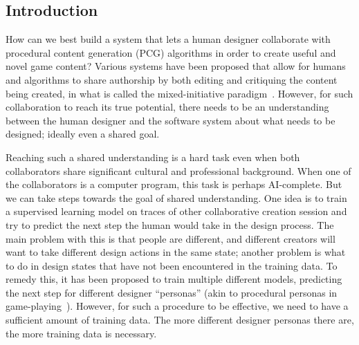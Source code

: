 \subsection{Introduction}




How can we best build a system that lets a human designer collaborate with procedural content generation (PCG) algorithms in order to create useful and novel game content? Various systems have been proposed that allow for humans and algorithms to share authorship by both editing and critiquing the content being created, in what is called the mixed-initiative paradigm~. However, for such collaboration to reach its true potential, there needs to be an understanding between the human designer and the software system about what needs to be designed; ideally even a shared goal.

Reaching such a shared understanding is a hard task even when both collaborators share significant cultural and professional background. When one of the collaborators is a computer program, this task is perhaps AI-complete. But we can take steps towards the goal of shared understanding. One idea is to train a supervised learning model on traces of other collaborative creation session and try to predict the next step the human would take in the design process. The main problem with this is that people are different, and different creators will want to take different design actions in the same state; another problem is what to do in design states that have not been encountered in the training data. To remedy this, it has been proposed to train multiple different models, predicting the next step for different designer ``personas'' (akin to procedural personas in game-playing~). However, for such a procedure to be effective, we need to have a sufficient amount of training data. The more different designer personas there are, the more training data is necessary.


